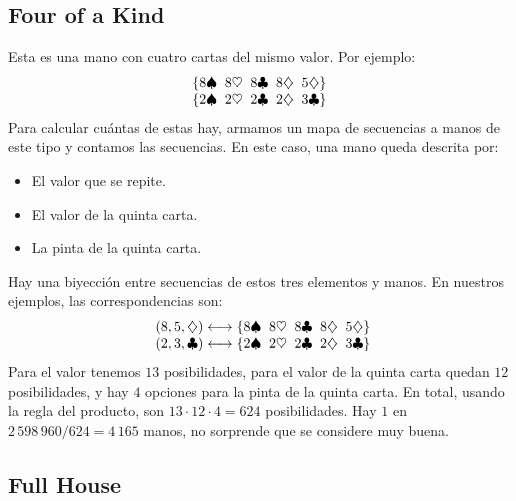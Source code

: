 \subsection{Four of a Kind}
\label{sec:four-of-a-kind}

  Esta es una mano con cuatro cartas del mismo valor.
  Por ejemplo:
  \begin{align*}
    \begin{array}{@{\{}*{4}{c@{\;\;}}c@{\}}}
      8 \spadesuit  & 8 \heartsuit & 8 \clubsuit &
	8 \diamondsuit	 & 5 \diamondsuit \\
      2 \spadesuit  & 2 \heartsuit & 2 \clubsuit  &
	2 \diamondsuit	 & 3 \clubsuit
    \end{array}
  \end{align*}
  Para calcular cuántas de estas hay,
  armamos un mapa de secuencias a manos de este tipo
  y contamos las secuencias.
  En este caso,
  una mano queda descrita por:
  \begin{itemize}
  \item El valor que se repite.
  \item El valor de la quinta carta.
  \item La pinta de la quinta carta.
  \end{itemize}
  Hay una biyección entre secuencias de estos tres elementos
  y manos.
  En nuestros ejemplos,
  las correspondencias son:
  \begin{align*}
    \begin{array}{l@{{} \longleftrightarrow \{}*{4}{c@{\;\;}}c@{\}}}
      (8, 5, \diamondsuit) &
	8 \spadesuit & 8 \heartsuit & 8 \clubsuit & 8 \diamondsuit
	   & 5 \diamondsuit \\
      (2, 3, \clubsuit)	   &
	2 \spadesuit & 2 \heartsuit & 2 \clubsuit & 2 \diamondsuit
	   & 3 \clubsuit
    \end{array}
  \end{align*}
  Para el valor tenemos \(13\) posibilidades,
  para el valor de la quinta carta quedan \(12\) posibilidades,
  y hay \(4\) opciones para la pinta de la quinta carta.
  En total,
  usando la regla del producto,%
  son \(13 \cdot 12 \cdot 4 = 624\) posibilidades.
  Hay \(1\) en \(2\,598\,960 / 624 = 4\,165\) manos,
  no sorprende que se considere muy buena.

\subsection{Full House}
\label{sec:full-house}

